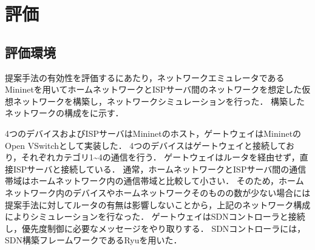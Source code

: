 \documentclass[a4paper,11pt,uplatex]{ujreport}
\begin{document}




\chapter{評価}
\label{chap:評価}

\section{評価環境}
\label{評価環境}

  提案手法の有効性を評価するにあたり，ネットワークエミュレータであるMininetを用いてホームネットワークとISPサーバ間のネットワークを想定した仮想ネットワークを構築し，ネットワークシミュレーションを行った．
  構築したネットワークの構成をに示す．\par


  4つのデバイスおよびISPサーバはMininetのホスト，ゲートウェイはMininetのOpen VSwitchとして実装した．
  4つのデバイスはゲートウェイと接続しており，それぞれカテゴリ1\textasciitilde4の通信を行う．
  ゲートウェイはルータを経由せず，直接ISPサーバと接続している．
  通常，ホームネットワークとISPサーバ間の通信帯域はホームネットワーク内の通信帯域と比較して小さい．
  そのため，ホームネットワーク内のデバイスやホームネットワークそのものの数が少ない場合には提案手法に対してルータの有無は影響しないことから，上記のネットワーク構成によりシミュレーションを行なった．
  ゲートウェイはSDNコントローラと接続し，優先度制御に必要なメッセージをやり取りする．
  SDNコントローラには，SDN構築フレームワークであるRyuを用いた．\par
\end{document}
